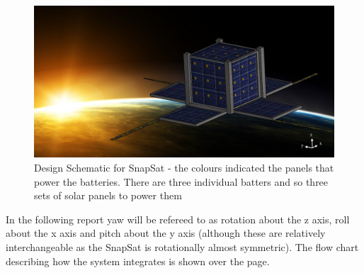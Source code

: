 \begin{figure}[H]
\includegraphics[width=\textwidth]{Picture1}
\caption{Design Schematic for SnapSat - the colours indicated the panels that power the batteries. There are three individual batters and so three sets of solar panels to power them}
\label{fig:flower}
\end{figure}
\noindent
In the following report yaw will be refereed to as rotation about the z axis, roll about the x axis and pitch about the y axis (although these are relatively interchangeable as the SnapSat is rotationally almost symmetric). The flow chart describing how the system integrates is shown over the page.

\begin{figure}[H]
\end{figure}
